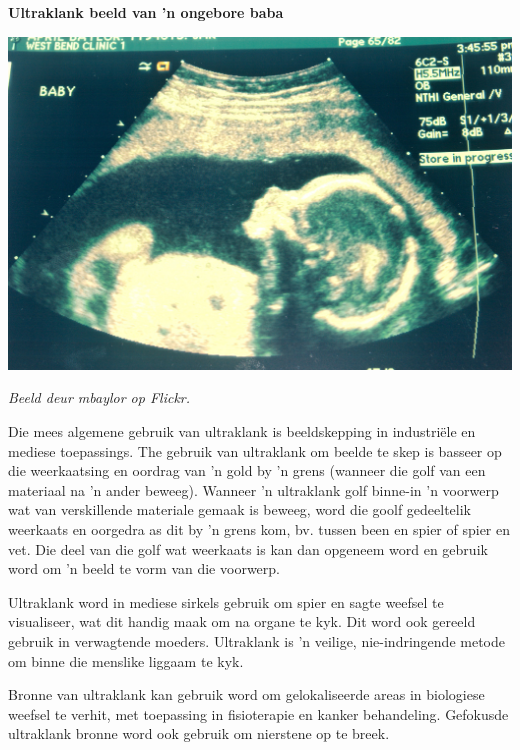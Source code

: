 \begin{minipage}{.5\textwidth}
\begin{center}
\textbf{Ultraklank beeld van  'n ongebore baba}\par
\includegraphics[width=.8\columnwidth]{../Grade10/photos/ultrasound_mbaylor_flickr.jpg}
\par\textit{Beeld deur mbaylor op Flickr.}
\end{center}
\end{minipage}
\begin{minipage}{.5\textwidth}

Die mees algemene gebruik van ultraklank is beeldskepping in industri\"ele en mediese toepassings. The gebruik van ultraklank om beelde te skep is basseer op die weerkaatsing en oordrag van  'n gold by  'n grens (wanneer die golf van een materiaal na  'n ander beweeg). Wanneer  'n ultraklank golf binne-in  'n voorwerp wat van verskillende materiale gemaak is beweeg, word die goolf gedeeltelik weerkaats en oorgedra as dit by  'n grens kom, bv. tussen been en spier of spier en vet. Die deel van die golf wat weerkaats is kan dan opgeneem word en gebruik word om  'n beeld te vorm van die voorwerp. \par

Ultraklank word in mediese sirkels gebruik om spier en sagte weefsel te visualiseer, wat dit handig maak om na organe te kyk. Dit word ook gereeld gebruik in verwagtende moeders. Ultraklank is  'n veilige, nie-indringende metode om binne die menslike liggaam te kyk. \par
      
\end{minipage}

Bronne van ultraklank kan gebruik word om gelokaliseerde areas in biologiese weefsel te verhit, met toepassing in fisioterapie en kanker behandeling. Gefokusde ultraklank bronne word ook gebruik om nierstene op te breek.\par

